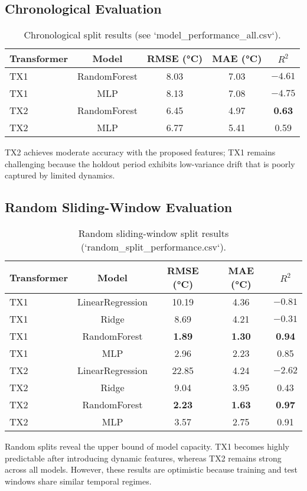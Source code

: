 \documentclass[11pt]{article}
\begin{document}
\subsection{Chronological Evaluation}
\begin{table}[H]
    \centering
    \begin{tabular}{lcccc}
        \toprule
        Transformer & Model & RMSE (°C) & MAE (°C) & $R^2$ \\
        \midrule
        TX1 & RandomForest & 8.03 & 7.03 & $-4.61$ \\
        TX1 & MLP          & 8.13 & 7.08 & $-4.75$ \\
        TX2 & RandomForest & 6.45 & 4.97 & \textbf{0.63} \\
        TX2 & MLP          & 6.77 & 5.41 & 0.59 \\
        \bottomrule
    \end{tabular}
    \caption{Chronological split results (see `model_performance_all.csv`).}
    \label{tab:chronological}
\end{table}
TX2 achieves moderate accuracy with the proposed features; TX1 remains challenging because the holdout period exhibits low-variance drift that is poorly captured by limited dynamics.

\subsection{Random Sliding-Window Evaluation}
\begin{table}[H]
    \centering
    \begin{tabular}{lcccc}
        \toprule
        Transformer & Model & RMSE (°C) & MAE (°C) & $R^2$ \\
        \midrule
        TX1 & LinearRegression & 10.19 & 4.36 & $-0.81$ \\
        TX1 & Ridge            & 8.69  & 4.21 & $-0.31$ \\
        TX1 & RandomForest     & \textbf{1.89} & \textbf{1.30} & \textbf{0.94} \\
        TX1 & MLP              & 2.96  & 2.23 & 0.85 \\
        TX2 & LinearRegression & 22.85 & 4.24 & $-2.62$ \\
        TX2 & Ridge            & 9.04  & 3.95 & 0.43 \\
        TX2 & RandomForest     & \textbf{2.23} & \textbf{1.63} & \textbf{0.97} \\
        TX2 & MLP              & 3.57  & 2.75 & 0.91 \\
        \bottomrule
    \end{tabular}
    \caption{Random sliding-window split results (`random_split_performance.csv`).}
    \label{tab:random}
\end{table}
Random splits reveal the upper bound of model capacity. TX1 becomes highly predictable after introducing dynamic features, whereas TX2 remains strong across all models. However, these results are optimistic because training and test windows share similar temporal regimes.
\end{document}
